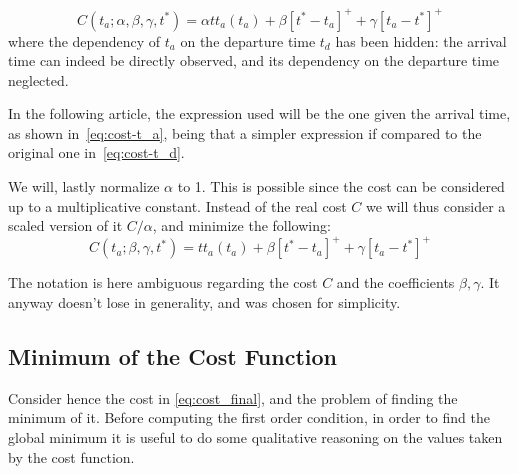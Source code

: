 \begin{equation}
  \label{eq:cost-t_a}
  C(t_a; \alpha, \beta, \gamma, t^*) = \alpha tt_a(t_a) + \beta[t^*- t_a]^+ + \gamma[t_a - t^*]^+ 
\end{equation}
where the dependency of \(t_a\) on the departure time \(t_d\) has been hidden:
the arrival time can indeed be directly observed,
and its dependency on the departure time neglected.

In the following article,
the expression used will be the one given the arrival time, as shown in~\eqref{eq:cost-t_a},
being that a simpler expression if compared to the original one in~\eqref{eq:cost-t_d}.

We will, lastly normalize \(\alpha\) to 1.
This is possible since the cost can be considered up to a multiplicative constant.
Instead of the real cost \(C\) we will thus consider a scaled version of it \(C/\alpha\),
and minimize the following:
\begin{equation}
  \label{eq:cost_final}
  C(t_a; \beta, \gamma, t^*) = tt_a(t_a) + \beta[t^*- t_a]^+ + \gamma[t_a - t^*]^+ 
\end{equation}

The notation is here ambiguous regarding the cost \(C\) and the coefficients \(\beta,\gamma\).
It anyway doesn't lose in generality, and was chosen for simplicity.

\subsection{Minimum of the Cost Function}
\label{sec:cost_minima}



Consider hence the cost in \eqref{eq:cost_final},
and the problem of finding the minimum of it.
Before computing the first order condition,
in order to find the global minimum it is useful to do some qualitative reasoning on the values taken by the cost function.

